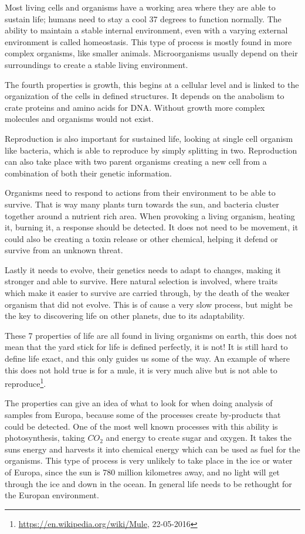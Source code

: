 Most living cells and organisms have a working area where they are able to sustain life; humans need to stay a cool 37 degrees to function normally. The ability to maintain a stable internal environment, even with a varying external environment is called homeostasis. This type of process is mostly found in more complex organisms, like smaller animals. Microorganisms usually depend on their surroundings to create a stable living environment.

The fourth properties is growth, this begins at a cellular level and is linked to the organization of the cells in defined structures. It depends on the anabolism to crate proteins and amino acids for DNA. Without growth more complex molecules and organisms would not exist.

Reproduction is also important for sustained life, looking at single cell organism like bacteria, which is able to reproduce by simply splitting in two. Reproduction can also take place with two parent organisms creating a new cell from a combination of both their genetic information.

Organisms need to respond to actions from their environment to be able to survive. That is way many plants turn towards the sun, and bacteria cluster together around a nutrient rich area. When provoking a living organism, heating it, burning it, a response should be detected. It does not need to be movement, it could also be creating a toxin release or other chemical, helping it defend or survive from an unknown threat.

Lastly it needs to evolve, their genetics needs to adapt to changes, making it stronger and able to survive. Here natural selection is involved, where traits which make it easier to survive are carried through, by the death of the weaker organism that did not evolve. This is of cause a very slow process, but might be the key to discovering life on other planets, due to its adaptability.

These 7 properties of life are all found in living organisms on earth, this does not mean that the yard stick for life is defined perfectly, it is not! It is still hard to define life exact, and this only guides us some of the way. An example of where this does not hold true is for a mule, it is very much alive but is not able to reproduce\footnote{\url{https://en.wikipedia.org/wiki/Mule}, 22-05-2016}.

The properties can give an idea of what to look for when doing analysis of samples from Europa, because some of the processes create by-products that could be detected. One of the most well known processes with this ability is photosynthesis, taking $CO_2$ and energy to create sugar and oxygen. It takes the suns energy and harvests it into chemical energy which can be used as fuel for the organisms. This type of process is very unlikely to take place in the ice or water of Europa, since the sun is 780 million kilometres away, and no light will get through the ice and down in the ocean. In general life needs to be rethought for the Europan environment.

